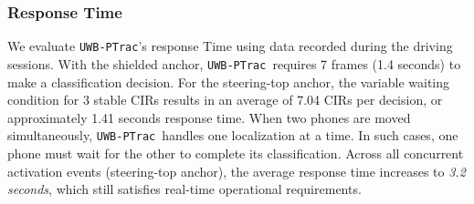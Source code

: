 \documentclass[sigconf]{acmart}
\newcommand{\edited}[1]{#1}
\newcommand{\name}{{{\tt UWB-PTrac}}}
\begin{document}
\vspace{-0.05in}
\subsubsection{Response Time}

We evaluate \name’s response Time using data recorded during the driving sessions.
%
With the shielded anchor, \name\ requires 7 frames (1.4 seconds) to make a classification decision. For the steering-top anchor, the variable waiting condition for 3 stable CIRs results in an average of 7.04 CIRs per decision, or approximately 1.41 seconds response time.
%
When two phones are moved simultaneously, \name\ handles one localization at a time. In such cases, one phone must wait for the other to complete its classification. Across all concurrent activation events (steering-top anchor), the average response time increases to \emph{3.2 seconds}, which still satisfies real-time operational requirements.



%
\end{document}
